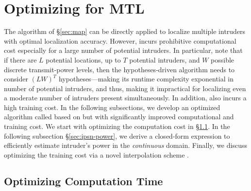 \section{{\texorpdfstring{\ouralgo}: Optimizing \mll for MTL}}
\label{sec:map-time}

The \map algorithm of \S\ref{sec:map} can be directly applied to
localize multiple intruders with optimal localization accuracy.
However, \map incurs prohibitive computational cost especially for a
large number of potential intruders.  In particular, note that if
there are $L$ potential locations, up to $T$ potential intruders, and
$W$ possible discrete transmit-power levels, then the
hypotheses-driven \map algorithm needs to consider $(LW)^T$
hypotheses---making its runtime complexity exponential in number of
potential intruders, and thus, making it impractical for localizing
even a moderate number of intruders present simultaneously.  In
addition, \mll also incurs a high training cost. In the following
subsections, we develop an optimized algorithm called \ouralgo based
on \map but with significantly improved computational and
training cost.
We start with optimizing the computation cost in \S\ref{sec:time}. In the following
  subsection \S\ref{sec:ipsn-power}, we derive a closed-form expression
  to efficiently estimate intruder's power in the {\em continuous}
  domain.  Finally, we discuss optimizing the training cost via a
  novel interpolation scheme \ildw.


%

\subsection{Optimizing Computation Time}
\label{sec:time}


